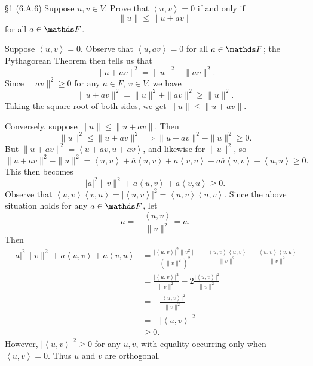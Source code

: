 \documentclass{homework}
\begin{document}
\begin{problem}{\S 1}
  (6.A.6) Suppose $u,v\in V$. Prove that $\left<u,v \right>=0$ if and only if \[
    \|u\|\le \|u+av\|
  \] for all $a\in \F$.
\end{problem}
\begin{solution}
  Suppose $\left<u,v \right>=0$. Observe that $\left<u,av \right> =0$ for all $a\in \F$; the
  Pythagorean Theorem then tells us that \[
    \|u+av\|^2=\|u\|^2+\|av\|^2
  .\] Since $\|av\|^2\ge 0$ for any $a\in F,\ v\in V$, we have \[
    \|u+av\|^2=\|u\|^2+\|av\|^2\ge \|u\|^2
  .\] Taking the square root of both sides, we get $\|u\|\le \|u+av\|$.

  Conversely, suppose $\|u\|\le \|u+av\|$. Then \[
    \|u\|^2\le \|u+av\|^2 \implies \|u+av\|^2-\|u\|^2\ge 0  
  .\] But $\|u+av\|^2=\left<u+av,u+av \right> $, and likewise for $\|u\|^2$, so \[
    \|u+av\|^2-\|u\|^2=\left<u,u \right> +\overline{a}\left<u,v \right> +a\left<v,u \right>
    +a\overline{a}\left<v,v \right> -\left<u,u \right> \ge 0
  .\] This then becomes \[
    \left| a \right| ^2\|v\|^2+\overline{a}\left<u,v \right> +a\left<v,u \right> \ge 0
  .\] Observe that $\left<u,v \right> \left<v,u \right> =\left| \left<u,v \right>  \right|
  ^2=\left<u,v \right> \left<u,v \right> $.  Since the above situation holds for any $a\in \F$, let
  \[
    a=-\frac{\left<u,v \right> }{\|v\|^2}=\overline{a}
  .\] Then
  \begin{align*}
    \left| a \right| ^2\|v\|^2+\overline{a}\left<u,v \right> +a\left<v,u \right> &= \frac{\left|
    \left<u,v \right>  \right| ^2\|v^2\|}{(\|v\|^2)^2}-\frac{\left<u,v \right> \left<u,v \right>
  }{\|v\|^2}-\frac{\left<u,v \right> \left<v,u \right> }{\|v\|^2}\\
  &= \frac{\left| \left<u,v \right>  \right|^2 }{\|v\|^2}-2 \frac{\left| \left<u,v \right>  \right|
  ^2}{\|v\|^2}\\
  &= -\frac{\left| \left<u,v \right>  \right| ^2}{\|v\|^2}\\
  &= -\left| \left<u,v \right>  \right| ^2 \\ 
  &\ge 0
  .\end{align*}
  However, $\left| \left<u,v \right>  \right| ^2\ge 0$ for any $u,v$, with equality occurring only
  when $\left<u,v \right> =0$. Thus $u$ and $v$ are orthogonal.
\end{solution}
\end{document}

